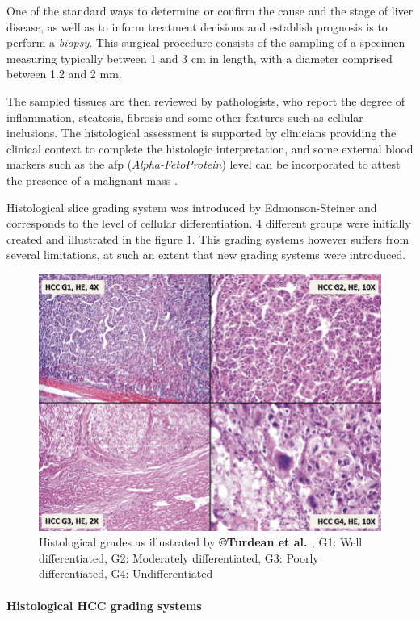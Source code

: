 One of the standard ways to determine or confirm the cause and the stage
of liver disease, as well as to inform treatment decisions and establish
prognosis is to perform a \emph{biopsy}. This surgical procedure consists of the sampling of a specimen measuring typically between 1 and 3 cm in length, with a diameter comprised between 1.2 and 2 mm\cite{Bravo2001}.

The sampled tissues are then reviewed by pathologists, who report the
degree of inflammation, steatosis, fibrosis and some other features such
as cellular inclusions. The histological assessment is supported by
clinicians providing the clinical context to complete the histologic
interpretation, and some external blood markers such as the \ac{afp}
(\emph{Alpha-FetoProtein}) level can be incorporated to attest the presence of
a malignant mass \cite{Bai2017a, Heimbach2018}.

Histological slice grading system was introduced by Edmonson-Steiner and corresponds to the level of cellular differentiation. 4 different groups were initially created and illustrated in the figure \ref{HistologicalGrades}. 
This grading systems however suffers from several limitations, at such an extent that new grading systems were introduced.

\begin{figure}[th!]
\centering
\includegraphics[width=0.7\linewidth]{images/image7}
\caption{Histological grades as illustrated by \textbf{©Turdean et al. \cite{Turdean2012}}, G1: Well differentiated, G2: Moderately differentiated, G3: Poorly differentiated, G4: Undifferentiated}
\label{HistologicalGrades}
\end{figure}


\paragraph{Histological HCC grading systems}\label{histological-hcc-grading-systems}

